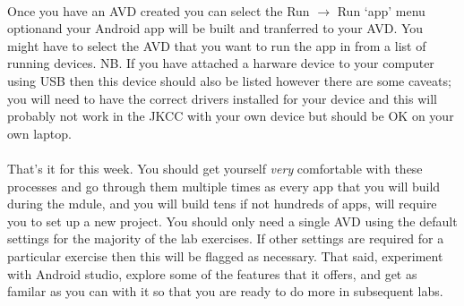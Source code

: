 \paragraph{} Once you have an AVD created you can select the Run $\to$ Run `app' menu optionand your Android app will be built and tranferred to your AVD. You might have to select the AVD that you want to run the app in from a list of running devices. NB. If you have attached a harware device to your computer using USB then this device should also be listed however there are some caveats; you will need to have the correct drivers installed for your device and this will probably not work in the JKCC with your own device but should be OK on your own laptop.

\paragraph{} That's it for this week. You should get yourself \emph{very} comfortable with these processes and go through them multiple times as every app that you will build during the mdule, and you will build tens if not hundreds of apps, will require you to set up a new project. You should only need a single AVD using the default settings for the majority of the lab exercises. If other settings are required for a particular exercise then this will be flagged as necessary. That said, experiment with Android studio, explore some of the features that it offers, and get as familar as you can with it so that you are ready to do more in subsequent labs.


